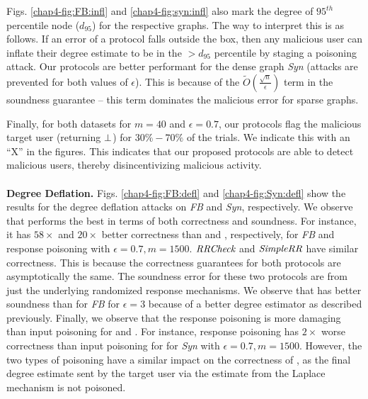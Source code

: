 \par Figs. \ref{chap4-fig:FB:infl} and \ref{chap4-fig:syn:infl} also mark the degree of $95^{th}$ percentile node ($d_{95}$) for the respective graphs. The way to interpret this is as follows.  If an error of a protocol falls outside the box, then any malicious user can inflate their degree estimate to be in the $>d_{95}$ percentile by staging a poisoning attack. Our protocols are better performant for the dense graph \textit{Syn} (attacks are prevented for both values of $\epsilon$). This is because of the $\tilde{O}(\frac{\sqrt{n}}{\epsilon})$ term in the soundness guarantee -- this term dominates the malicious error for sparse graphs. 

\par Finally, for both datasets for $m=40$ and $\epsilon = 0.7$, our protocols flag the malicious target user (returning $\perp$) for $30\%-70\%$ of the trials.  We indicate this with an ``X'' in the figures. This indicates that our proposed protocols are able to detect malicious users, thereby disincentivizing malicious activity.
\\\\
\noindent\textbf{Degree Deflation.}
Figs. \ref{chap4-fig:FB:defl} and  \ref{chap4-fig:Syn:defl} show the results for the degree deflation attacks on  \textit{FB} and \textit{Syn}, respectively. We observe that \DegHybrid{} performs the best in terms of both correctness and soundness. For instance, it has $58\times$ and $20\times$ better correctness than \DegRRNaive{} and \DegRRCheck{}, respectively, for \textit{FB} and response poisoning with $\epsilon=0.7, m=1500$. $\textit{RRCheck}{}$ and $\textit{SimpleRR}{}$ have similar correctness. This is because the correctness guarantees for both protocols are asymptotically the same. %
The soundness error for these two protocols are from just the underlying randomized response mechanisms. We observe that \DegRRCheck{} has better soundness than  \DegRRNaive{} for \textit{FB} for $\epsilon=3$ because of a better degree estimator as described previously. Finally, we observe that the response poisoning is more damaging than input poisoning for \DegRRNaive{} and \DegRRCheck. For instance, response poisoning has $2\times$ worse correctness than input poisoning for \DegRRCheck{} for \textit{Syn} with $\epsilon=0.7,m=1500$. However, the two types of poisoning have a similar impact on the correctness of \DegHybrid{}, as the final degree estimate sent by the target user via the estimate from the Laplace mechanism is not poisoned.

